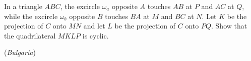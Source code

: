 In a triangle $ABC$, the excircle $\omega_a$ opposite $A$ touches $AB$ at $P$ and $AC$ at $Q$, while the excircle $\omega_b$ opposite $B$ touches $BA$ at $M$ and $BC$ at $N$. Let $K$ be the projection of $C$ onto $MN$ and let $L$ be the projection of $C$ onto $PQ$. Show that the quadrilateral $MKLP$ is cyclic.

(\textit{Bulgaria})